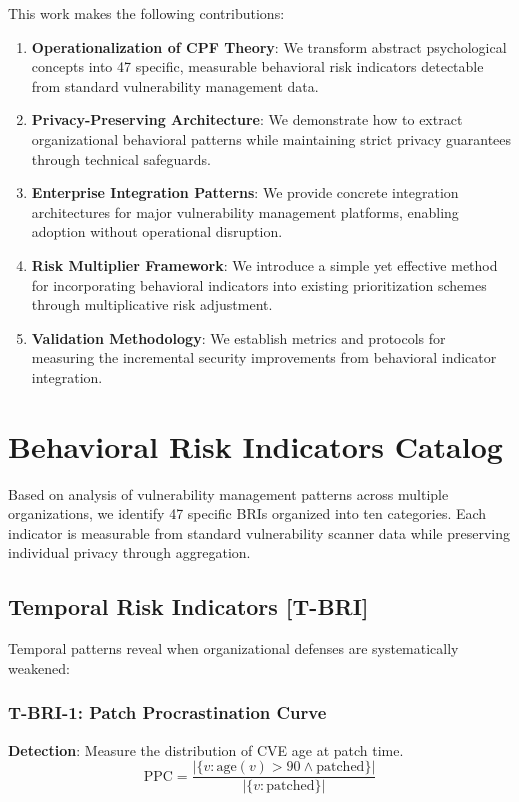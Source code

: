 \documentclass[11pt,a4paper]{article}
\begin{document}
This work makes the following contributions:

\begin{enumerate}
\item \textbf{Operationalization of CPF Theory}: We transform abstract psychological concepts into 47 specific, measurable behavioral risk indicators detectable from standard vulnerability management data.

\item \textbf{Privacy-Preserving Architecture}: We demonstrate how to extract organizational behavioral patterns while maintaining strict privacy guarantees through technical safeguards.

\item \textbf{Enterprise Integration Patterns}: We provide concrete integration architectures for major vulnerability management platforms, enabling adoption without operational disruption.

\item \textbf{Risk Multiplier Framework}: We introduce a simple yet effective method for incorporating behavioral indicators into existing prioritization schemes through multiplicative risk adjustment.

\item \textbf{Validation Methodology}: We establish metrics and protocols for measuring the incremental security improvements from behavioral indicator integration.
\end{enumerate}

\section{Behavioral Risk Indicators Catalog}

Based on analysis of vulnerability management patterns across multiple organizations, we identify 47 specific BRIs organized into ten categories. Each indicator is measurable from standard vulnerability scanner data while preserving individual privacy through aggregation.

\subsection{Temporal Risk Indicators [T-BRI]}

Temporal patterns reveal when organizational defenses are systematically weakened:

\subsubsection{T-BRI-1: Patch Procrastination Curve}
\textbf{Detection}: Measure the distribution of CVE age at patch time.
\begin{equation}
\text{PPC} = \frac{|\{v : \text{age}(v) > 90 \land \text{patched}\}|}{|\{v : \text{patched}\}|}
\end{equation}
\end{document}
